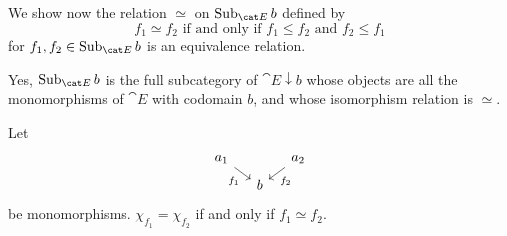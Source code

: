We show now the relation \(\simeq\) on \(\subobjs_{\cat E} b\) defined by
\[f_1 \simeq f_2 \text{ if and only if } f_1 \le f_2 \text{ and } f_2 \le f_1\]
for \(f_1, f_2 \in \subobjs_{\cat E} b\) is an equivalence relation. \NotaInterna{\dots{}}

Yes, \(\subobjs_{\cat E} b\) is the full subcategory of \(\cat E \downarrow b\) whose objects are all the monomorphisms of \(\cat E\) with codomain \(b\), and whose isomorphism relation is \(\simeq\).

\begin{proposition}
Let
\[\begin{tikzcd}[row sep=tiny,column sep=small]
a_1 \ar["{f_1}", dr, swap] & & a_2 \ar["{f_2}", dl] \\
& b 
\end{tikzcd}\]
be monomorphisms. \(\chi_{f_1} = \chi_{f_2}\) if and only if \(f_1 \simeq f_2\).
\end{proposition}

